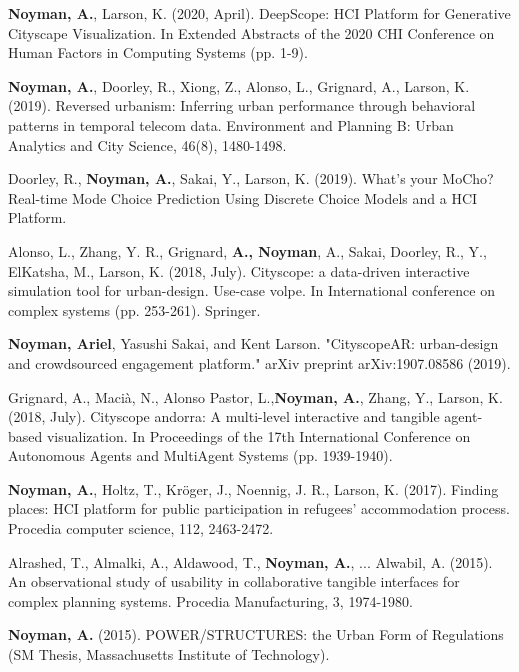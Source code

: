 {
\textbf{Noyman, A.}, Larson, K. (2020, April). DeepScope: HCI Platform for Generative Cityscape Visualization. In Extended Abstracts of the 2020 CHI Conference on Human Factors in Computing Systems (pp. 1-9).
}

{
\textbf{Noyman, A.}, Doorley, R., Xiong, Z., Alonso, L., Grignard, A., Larson, K. (2019). Reversed urbanism: Inferring urban performance through behavioral patterns in temporal telecom data. Environment and Planning B: Urban Analytics and City Science, 46(8), 1480-1498.
}

{
Doorley, R., \textbf{Noyman, A.}, Sakai, Y., Larson, K. (2019). What's your MoCho? Real-time Mode Choice Prediction Using Discrete Choice Models and a HCI Platform.
}

{
Alonso, L., Zhang, Y. R., Grignard, \textbf{A., Noyman}, A., Sakai, Doorley, R., Y., ElKatsha, M., Larson, K. (2018, July). Cityscope: a data-driven interactive simulation tool for urban-design. Use-case volpe. In International conference on complex systems (pp. 253-261). Springer.
}

{
\textbf{Noyman, Ariel}, Yasushi Sakai, and Kent Larson. "Cityscope{AR}: urban-design and crowdsourced engagement platform." arXiv preprint arXiv:1907.08586 (2019).
}

{
Grignard, A., Macià, N., Alonso Pastor, L.,\textbf{Noyman, A.}, Zhang, Y., Larson, K. (2018, July). Cityscope andorra: A multi-level interactive and tangible agent-based visualization. In Proceedings of the 17th International Conference on Autonomous Agents and MultiAgent Systems (pp. 1939-1940).
}

{
\textbf{Noyman, A.}, Holtz, T., Kröger, J., Noennig, J. R., Larson, K. (2017). Finding places: HCI platform for public participation in refugees’ accommodation process. Procedia computer science, 112, 2463-2472.
}

{
Alrashed, T., Almalki, A., Aldawood, T., \textbf{Noyman, A.}, ... Alwabil, A. (2015). An observational study of usability in collaborative tangible interfaces for complex planning systems. Procedia Manufacturing, 3, 1974-1980.
}

{
\textbf{Noyman, A.} (2015). POWER/STRUCTURES: the Urban Form of Regulations (SM Thesis, Massachusetts Institute of Technology).
}